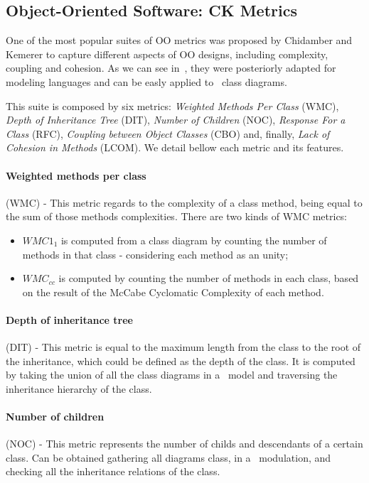 \subsection{Object-Oriented Software: \textrm{CK} Metrics}
One of the most popular suites of OO metrics was proposed by Chidamber and Kemerer \cite{Chidamber:1994:MSO:630808.631131} to capture different aspects of OO designs, including complexity, coupling and cohesion. 
As we can see in~\cite{Power2}, they were posteriorly adapted for modeling languages and can be easly applied to \uml\ class diagrams.

This suite is composed by six metrics: \emph{Weighted Methods Per Class} (WMC), \emph{Depth of Inheritance Tree} (DIT), \emph{Number of Children} (NOC), \emph{Response For a Class} (RFC), \emph{Coupling between Object Classes} (CBO) and, finally, \emph{Lack of Cohesion in Methods} (LCOM).
We detail bellow each metric and its features.

\paragraph{Weighted methods per class} (WMC) - This metric regards to the complexity of a class method, being equal to the sum of those methods complexities. There are two kinds of WMC metrics:
\begin{itemize}
\item \textbf{$WMC1_{1}$} is computed from a class diagram by counting the number of methods in that class - considering each method as an unity;
\item \textbf{$WMC_{cc}$} is computed by counting the number of methods in each class, based on the result of the McCabe Cyclomatic Complexity of each method.
\end{itemize}

\paragraph{Depth of inheritance tree} (DIT) - This metric is equal to the maximum length from the class to the root of the inheritance, which could be defined as the depth of the class. It is computed by taking the union of all the class diagrams in a \uml\ model and traversing the inheritance hierarchy of the class.

\paragraph{Number of children} (NOC) - This metric represents the number of childs and descendants of a certain class. Can be obtained gathering all diagrams class, in a \uml\ modulation, and checking all the inheritance relations of the class.

